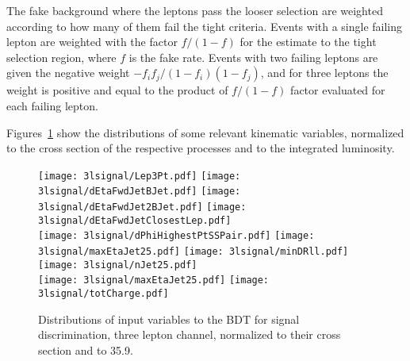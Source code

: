 The fake background where the leptons pass the looser selection are weighted according to how many of them fail the tight criteria. Events with a single failing lepton are weighted with the factor $f/(1-f)$ for the estimate to the tight selection region, where $f$ is the fake rate. Events with two failing leptons are given the negative weight $-f_{i}f_{j}/(1-f_{i})(1-f_{j})$, and for three leptons the weight is positive and equal to the product of $f/(1-f)$ factor evaluated for each failing lepton.


Figures~\ref{fig:input_vars_3l_xsec} show the distributions of some relevant kinematic variables, normalized to the cross section of the respective processes and to the integrated luminosity.
\begin{figure} [!h]
 \centering
 \texttt{[image: 3lsignal/Lep3Pt.pdf]} 
 \texttt{[image: 3lsignal/dEtaFwdJetBJet.pdf]}
 \texttt{[image: 3lsignal/dEtaFwdJet2BJet.pdf]}
 \texttt{[image: 3lsignal/dEtaFwdJetClosestLep.pdf]} \\
 \texttt{[image: 3lsignal/dPhiHighestPtSSPair.pdf]}
 \texttt{[image: 3lsignal/maxEtaJet25.pdf]}
 \texttt{[image: 3lsignal/minDRll.pdf]}
 \texttt{[image: 3lsignal/nJet25.pdf]} \\
 \texttt{[image: 3lsignal/maxEtaJet25.pdf]}
 \texttt{[image: 3lsignal/totCharge.pdf]}
\caption[Input variables to the BDT for signal discrimination normalized.]{Distributions of input variables to the BDT for signal discrimination, three lepton channel, normalized to their cross section and to 35.9\fbinv.} 
\label{fig:input_vars_3l_xsec}
\end{figure}    

